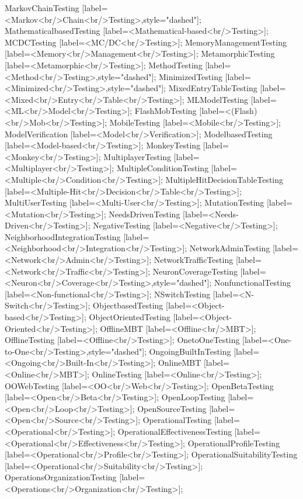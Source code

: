 \documentclass{article}
\begin{document}
{MarkovChainTesting [label=<Markov<br/>Chain<br/>Testing>,style="dashed"];
MathematicalbasedTesting [label=<Mathematical-based<br/>Testing>];
MCDCTesting [label=<MC/DC<br/>Testing>];
MemoryManagementTesting [label=<Memory<br/>Management<br/>Testing>];
MetamorphicTesting [label=<Metamorphic<br/>Testing>];
MethodTesting [label=<Method<br/>Testing>,style="dashed"];
MinimizedTesting [label=<Minimized<br/>Testing>,style="dashed"];
MixedEntryTableTesting [label=<Mixed<br/>Entry<br/>Table<br/>Testing>];
MLModelTesting [label=<ML<br/>Model<br/>Testing>];
FlashMobTesting [label=<(Flash)<br/>Mob<br/>Testing>];
MobileTesting [label=<Mobile<br/>Testing>];
ModelVerification [label=<Model<br/>Verification>];
ModelbasedTesting [label=<Model-based<br/>Testing>];
MonkeyTesting [label=<Monkey<br/>Testing>];
MultiplayerTesting [label=<Multiplayer<br/>Testing>];
MultipleConditionTesting [label=<Multiple<br/>Condition<br/>Testing>];
MultipleHitDecisionTableTesting [label=<Multiple-Hit<br/>Decision<br/>Table<br/>Testing>];
MultiUserTesting [label=<Multi-User<br/>Testing>];
MutationTesting [label=<Mutation<br/>Testing>];
NeedsDrivenTesting [label=<Needs-Driven<br/>Testing>];
NegativeTesting [label=<Negative<br/>Testing>];
NeighborhoodIntegrationTesting [label=<Neighborhood<br/>Integration<br/>Testing>];
NetworkAdminTesting [label=<Network<br/>Admin<br/>Testing>];
NetworkTrafficTesting [label=<Network<br/>Traffic<br/>Testing>];
NeuronCoverageTesting [label=<Neuron<br/>Coverage<br/>Testing>,style="dashed"];
NonfunctionalTesting [label=<Non-functional<br/>Testing>];
NSwitchTesting [label=<N-Switch<br/>Testing>];
ObjectbasedTesting [label=<Object-based<br/>Testing>];
ObjectOrientedTesting [label=<Object-Oriented<br/>Testing>];
OfflineMBT [label=<Offline<br/>MBT>];
OfflineTesting [label=<Offline<br/>Testing>];
OnetoOneTesting [label=<One-to-One<br/>Testing>,style="dashed"];
OngoingBuiltInTesting [label=<Ongoing<br/>Built-In<br/>Testing>];
OnlineMBT [label=<Online<br/>MBT>];
OnlineTesting [label=<Online<br/>Testing>];
OOWebTesting [label=<OO<br/>Web<br/>Testing>];
OpenBetaTesting [label=<Open<br/>Beta<br/>Testing>];
OpenLoopTesting [label=<Open<br/>Loop<br/>Testing>];
OpenSourceTesting [label=<Open<br/>Source<br/>Testing>];
OperationalTesting [label=<Operational<br/>Testing>];
OperationalEffectivenessTesting [label=<Operational<br/>Effectiveness<br/>Testing>];
OperationalProfileTesting [label=<Operational<br/>Profile<br/>Testing>];
OperationalSuitabilityTesting [label=<Operational<br/>Suitability<br/>Testing>];
OperationsOrganizationTesting [label=<Operations<br/>Organization<br/>Testing>];
}
\end{document}
